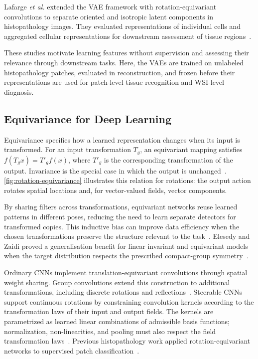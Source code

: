 \documentclass{midl}
\begin{document}
Lafarge \emph{et al.} extended the VAE framework with rotation-equivariant convolutions to separate oriented and isotropic latent components in histopathology images. They evaluated representations of individual cells and aggregated cellular representations for downstream assessment of tissue regions~\cite{lafarge_orientation_2020}.

These studies motivate learning features without supervision and assessing their relevance through downstream tasks. Here, the VAEs are trained on unlabeled histopathology patches, evaluated in reconstruction, and frozen before their representations are used for patch-level tissue recognition and WSI-level diagnosis.

\subsection{Equivariance for Deep Learning}

Equivariance specifies how a learned representation changes when its input is transformed. For an input transformation $T_g$, an equivariant mapping satisfies $f(T_g x)=T'_g f(x)$, where $T'_g$ is the corresponding transformation of the output. Invariance is the special case in which the output is unchanged~\cite{cohen_group_2016}. \autoref{fig:rotation-equivariance} illustrates this relation for rotations: the output action rotates spatial locations and, for vector-valued fields, vector components.

By sharing filters across transformations, equivariant networks reuse learned patterns in different poses, reducing the need to learn separate detectors for transformed copies. This inductive bias can improve data efficiency when the chosen transformations preserve the structure relevant to the task~\cite{cohen_group_2016}. Elesedy and Zaidi proved a generalisation benefit for linear invariant and equivariant models when the target distribution respects the prescribed compact-group symmetry~\cite{elesedy_provably_2021}.

Ordinary CNNs implement translation-equivariant convolutions through spatial weight sharing. Group convolutions extend this construction to additional transformations, including discrete rotations and reflections~\cite{cohen_group_2016}. Steerable CNNs support continuous rotations by constraining convolution kernels according to the transformation laws of their input and output fields. The kernels are parametrized as learned linear combinations of admissible basis functions; normalization, non-linearities, and pooling must also respect the field transformation laws~\cite{cohen_steerable_2017,weiler_general_2019}. Previous histopathology work applied rotation-equivariant networks to supervised patch classification~\cite{veeling_rotation_2018,graham_dense_2020}.
\end{document}
